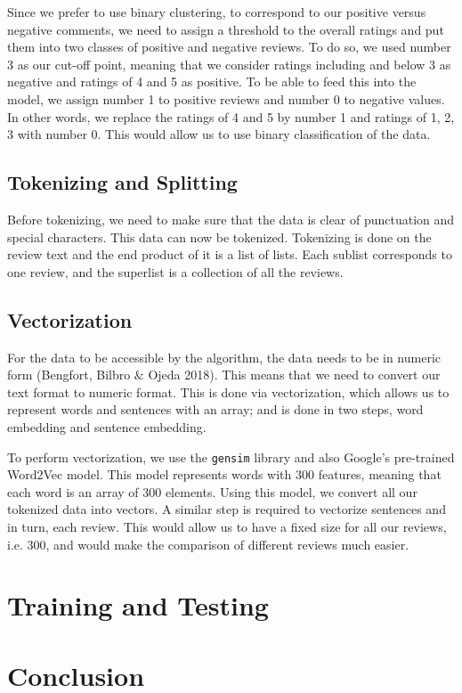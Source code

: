 \documentclass[a4paper,12pt]{article}
\begin{document}
Since we prefer to use binary clustering, to correspond to our positive versus negative comments, we need to assign a threshold to the overall ratings and put them into two classes of positive and negative reviews. To do so, we used number 3 as our cut-off point, meaning that we consider ratings including and below 3 as negative and ratings of 4 and 5 as positive. To be able to feed this into the model, we assign number 1 to positive reviews and number 0 to negative values. In other words, we replace the ratings of 4 and 5 by number 1 and ratings of 1, 2, 3 with number 0. This would allow us to use binary classification of the data. 


\subsection{Tokenizing and Splitting}
Before tokenizing, we need to make sure that the data is clear of punctuation and special characters. This data can now be tokenized. Tokenizing is done on the review text and the end product of it is a list of lists. Each sublist corresponds to one review, and the superlist is a collection of all the reviews. 

\subsection{Vectorization}
For the data to be accessible by the algorithm, the data needs to be in numeric form (Bengfort, Bilbro $\&$ Ojeda 2018). This means that we need to convert our text format to numeric format. This is done via vectorization, which allows us to represent words and sentences with an array; and is done in two steps, word embedding and sentence embedding. 

To perform vectorization, we use the \texttt{gensim} library and also Google's pre-trained Word2Vec model. This model represents words with 300 features, meaning that each word is an array of 300 elements. Using this model, we convert all our tokenized data into vectors. A similar step is required to vectorize sentences and in turn, each review. This would allow us to have a fixed size for all our reviews, i.e. 300, and would make the comparison of different reviews much easier. 

\section{Training and Testing}

\section{Conclusion}
\end{document}

